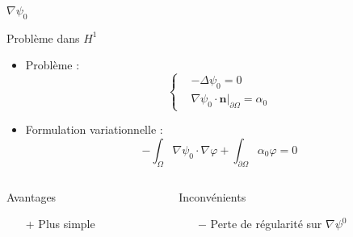 \documentclass{beamer}
\newcommand{\grad}{{\nabla}}
\newcommand{\laplace}{{\Delta}}
\newcommand{\restr}{{\big\rvert_{\partial\Omega}}}
\begin{document}
\begin{frame}{$\grad\psi_0$}
\begin{block}{Problème dans $ H^1$}
\begin{itemize}
\item Problème :
\[\left\{
\begin{aligned}
&-\laplace\psi_0 = 0\\
&\grad\psi_0\cdot \mathbf{n}\restr=\alpha_0
\end{aligned}
\right.\]
\item Formulation variationnelle :
\[
-\int_\Omega \grad\psi_0\cdot\grad\varphi + \int_{\partial\Omega} \alpha_0\varphi = 0
\]
\end{itemize}
\end{block}
\begin{columns}[t]
\begin{column}{5cm}
\begin{exampleblock}{Avantages}
\begin{itemize}
\item[+] Plus simple
\end{itemize}
\end{exampleblock}
\end{column}
\begin{column}{5cm}
\begin{alertblock}{Inconvénients}
\begin{itemize}
\item[$-$] Perte de régularité sur $\grad\psi^0$
\end{itemize}
\end{alertblock}
\end{column}
\end{columns}
\end{frame}
\end{document}
